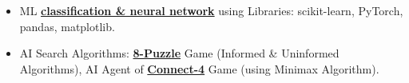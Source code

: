 \begin{itemize}[itemsep=0pt, parsep=0pt, topsep=0pt]
  \item{ \footnotesize ML \textbf{\textcolor{cyan}{\href{https://github.com/AsmaaJAH/Data-classifications-and-Neural-Network-using-random-data}{classification \& neural network}}}  using Libraries: scikit-learn, PyTorch, pandas, matplotlib. }
  \item {\footnotesize AI Search Algorithms: \textbf{\textcolor{cyan}{\href{https://github.com/AsmaaJAH/8_puzzle}{8-Puzzle}}} Game (Informed \& Uninformed Algorithms), AI Agent of \textbf{\textcolor{cyan}{\href{https://github.com/AsmaaJAH/Connect-4-AI-Agent}{Connect-4}}} Game (using Minimax Algorithm).}
 \end{itemize}


